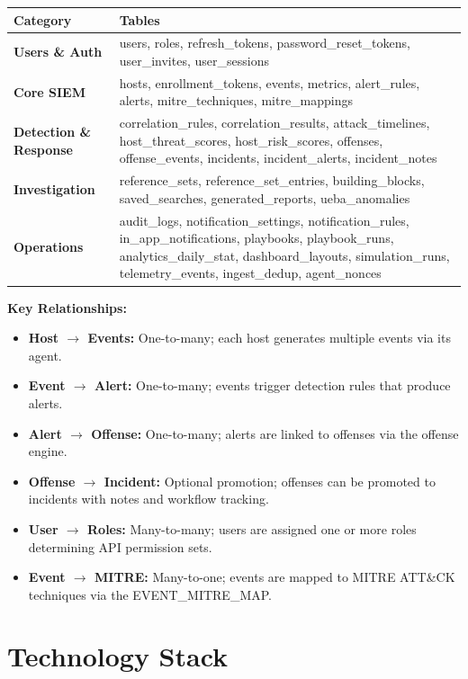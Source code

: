 \begin{longtable}{|l|l|}
\hline
\textbf{Category} & \textbf{Tables} \\
\hline
\textbf{Users \& Auth} & users, roles, refresh\_tokens, password\_reset\_tokens, user\_invites, user\_sessions \\
\hline
\textbf{Core SIEM} & hosts, enrollment\_tokens, events, metrics, alert\_rules, alerts, mitre\_techniques, mitre\_mappings \\
\hline
\textbf{Detection \& Response} & correlation\_rules, correlation\_results, attack\_timelines, host\_threat\_scores, host\_risk\_scores, offenses, offense\_events, incidents, incident\_alerts, incident\_notes \\
\hline
\textbf{Investigation} & reference\_sets, reference\_set\_entries, building\_blocks, saved\_searches, generated\_reports, ueba\_anomalies \\
\hline
\textbf{Operations} & audit\_logs, notification\_settings, notification\_rules, in\_app\_notifications, playbooks, playbook\_runs, analytics\_daily\_stat, dashboard\_layouts, simulation\_runs, telemetry\_events, ingest\_dedup, agent\_nonces \\
\hline
\end{longtable}

\noindent\textbf{Key Relationships:}

\begin{itemize}
    \item \textbf{Host $\rightarrow$ Events:} One-to-many; each host generates multiple events via its agent.
    \item \textbf{Event $\rightarrow$ Alert:} One-to-many; events trigger detection rules that produce alerts.
    \item \textbf{Alert $\rightarrow$ Offense:} One-to-many; alerts are linked to offenses via the offense engine.
    \item \textbf{Offense $\rightarrow$ Incident:} Optional promotion; offenses can be promoted to incidents with notes and workflow tracking.
    \item \textbf{User $\rightarrow$ Roles:} Many-to-many; users are assigned one or more roles determining API permission sets.
    \item \textbf{Event $\rightarrow$ MITRE:} Many-to-one; events are mapped to MITRE ATT\&CK techniques via the EVENT\_MITRE\_MAP.
\end{itemize}

\section{Technology Stack}

